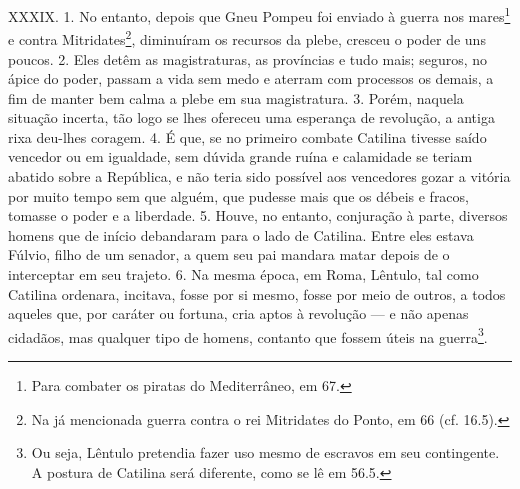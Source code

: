 XXXIX. 1. No entanto, depois que Gneu Pompeu foi enviado à guerra nos
mares\footnote{Para combater os piratas do Mediterrâneo, em 67.} e contra
Mitridates\footnote{Na já mencionada guerra contra o rei Mitridates do Ponto,
em 66 (cf. 16.5).}, diminuíram os recursos da plebe, cresceu o poder de uns
poucos. 2. Eles detêm as magistraturas, as províncias e tudo mais; seguros, no
ápice do poder, passam a vida sem medo e aterram com processos os demais, a fim
de manter bem calma a plebe em sua magistratura. 3. Porém, naquela situação
incerta, tão logo se lhes ofereceu uma esperança de revolução, a antiga rixa
deu-lhes coragem. 4. É que, se no primeiro combate Catilina tivesse saído vencedor ou
em igualdade, sem dúvida grande ruína e calamidade se teriam abatido sobre a
República, e não teria sido possível aos vencedores gozar a vitória por muito tempo
sem que alguém, que pudesse mais que os débeis e fracos, tomasse o poder e a
liberdade. 5. Houve, no entanto, conjuração à parte, diversos homens que de
início debandaram para o lado de Catilina. Entre eles estava Fúlvio, filho de
um senador, a quem seu pai mandara matar depois de o interceptar em seu
trajeto. 6. Na mesma época, em Roma, Lêntulo, tal como Catilina ordenara,
incitava, fosse por si mesmo, fosse por meio de outros, a todos aqueles que,
por caráter ou fortuna, cria aptos à revolução --- e não apenas cidadãos, mas
qualquer tipo de homens, contanto que fossem úteis na guerra\footnote{Ou seja,
Lêntulo pretendia fazer uso mesmo de escravos em seu contingente. A postura de
Catilina será diferente, como se lê em 56.5.}. 

